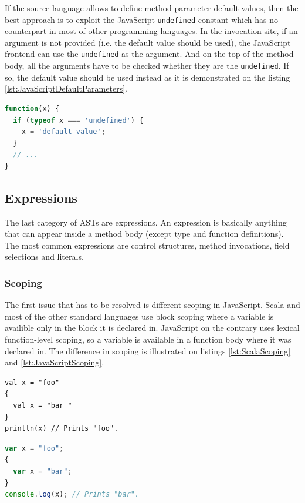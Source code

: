 \documentclass[12pt,a4paper]{report}
\begin{document}
If the source language allows to define method parameter default values, then the best approach is to exploit the JavaScript \texttt{undefined} constant which has no counterpart in most of other programming languages. In the invocation site, if an argument is not provided (i.e. the default value should be used), the JavaScript frontend can use the \texttt{undefined} as the argument. And on the top of the method body, all the arguments have to be checked whether they are the \texttt{undefined}. If so, the default value should be used instead as it is demonstrated on the listing \ref{lst:JavaScriptDefaultParameters}.

\begin{lstlisting}[language=JavaScript,caption={Default parameters in JavaScript.},label={lst:JavaScriptDefaultParameters}]
function(x) {
  if (typeof x === 'undefined') {
    x = 'default value';	
  }
  // ...
}
\end{lstlisting}

\subsection{Expressions}

The last category of ASTs are expressions. An expression is basically anything that can appear inside a method body (except type and function definitions). The most common expressions are control structures, method invocations, field selections and literals.

\subsubsection*{Scoping}

The first issue that has to be resolved is different scoping in JavaScript. Scala and most of the other standard languages use block scoping where a variable is availible only in the block it is declared in. JavaScript on the contrary uses lexical function-level scoping, so a variable is available in a function body where it was declared in. The difference in scoping is illustrated on listings \ref{lst:ScalaScoping} and \ref{lst:JavaScriptScoping}.

\begin{center}
\begin{minipage}{.48\textwidth}
  \begin{lstlisting}[caption={Scala scoping.},label={lst:ScalaScoping}]
val x = "foo"
{ 
  val x = "bar " 
}
println(x) // Prints "foo".
	\end{lstlisting}
\end{minipage}
\hfill
\begin{minipage}{.48\textwidth}
  \begin{lstlisting}[language=JavaScript,caption={JavaScript scoping.},label={lst:JavaScriptScoping}]
var x = "foo";
{ 
  var x = "bar";
}
console.log(x); // Prints "bar".
  \end{lstlisting}
\end{minipage}
\end{center}
\end{document}
